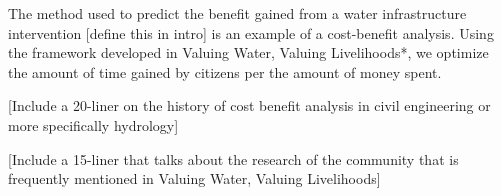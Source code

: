 The method used to predict the benefit gained from a water infrastructure intervention [define this in intro] is an example of a cost-benefit analysis. Using the framework developed in Valuing Water, Valuing Livelihoods*, we optimize the amount of time gained by citizens per the amount of money spent.

[Include a 20-liner on the history of cost benefit analysis in civil engineering or more specifically hydrology]

[Include a 15-liner that talks about the research of the community that is frequently mentioned in Valuing Water, Valuing Livelihoods]